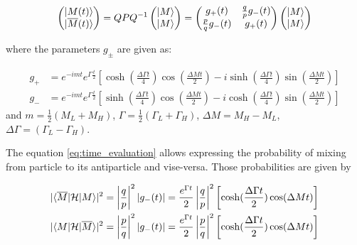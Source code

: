 \begin{align}
\label{eq:time_evaluation}
  \left(\begin{matrix} \lvert M(t)\rangle  \\ \lvert\overline{M}(t)\rangle \end{matrix}  \right) 
  = QPQ^{-1} \left(\begin{matrix} \lvert M\rangle  \\ \lvert M\rangle \end{matrix}  \right) 
  = \left(\begin{matrix} g_{+}(t) &  \frac{q}{p}g_{-}(t)  \\  \frac{p}{q}g_{-}(t)  & g_{+}(t)  \end{matrix}\right) 
  \left(\begin{matrix} \lvert M\rangle  \\ \lvert M\rangle \end{matrix}  \right)   
\end{align}

where the parameters $g_{\pm}$ are given as:

\begin{align}
    g_{+} &= e^{-imt}e^{\Gamma \frac{t}{2}} \left[ \cosh(\frac{\Delta \Gamma t}{4})\cos(\frac{\Delta M t}{2})  - i\sinh(\frac{\Delta \Gamma t}{4})\sin(\frac{\Delta M t}{2})  \right] \\ 
    g_{-} &= e^{-imt}e^{\Gamma \frac{t}{2}} \left[ \sinh(\frac{\Delta \Gamma t}{4})\cos(\frac{\Delta M t}{2})  - i\cosh(\frac{\Delta \Gamma t}{4})\sin(\frac{\Delta M t}{2})  \right]   
\end{align}
and $m = \frac{1}{2}(M_{L}+M_H)$, $\Gamma =  \frac{1}{2}(\Gamma_{L}+\Gamma_{H})$, $\Delta M = M_{H}- M_{L}$, $ \Delta \Gamma =(\Gamma_{L}-\Gamma_{H})$.

The equation \ref{eq:time_evaluation} allows expressing the probability of mixing from particle to its antiparticle and vise-versa. Those probabilities are given by 

\begin{align}
\label{eq:mixing_prob}
|\langle\overline{M}\rvert \mathcal{H} \lvert M\rangle|^{2} = \left|\frac{q}{p}\right|^{2} |g_{-}(t)| = \frac{e^{\Gamma t}}{2} \left|\frac{q}{p}\right|^{2}  \left[ \cosh(\frac{\Delta \Gamma t}{2})\cos(\Delta M t) \right] \\ 
|\langle M\rvert \mathcal{H} \lvert\overline{M}\rangle|^{2} = \left|\frac{p}{q}\right|^{2} |g_{-}(t)| = \frac{e^{\Gamma t}}{2} \left|\frac{p}{q}\right|^{2}  \left[ \cosh(\frac{\Delta \Gamma t}{2})\cos(\Delta M t) \right]
\end{align}

